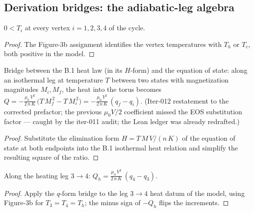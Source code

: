 \subsection*{Derivation bridges: the adiabatic-leg algebra}

\begin{lemma}
\label{lem:IPhO2026Problems_problem_IPhO_2026_3_C_2:vertex_T_pos}
$0 < T_i$ at every vertex $i = 1, 2, 3, 4$ of the cycle.
\end{lemma}
\begin{proof}
The Figure-3b assignment identifies the vertex temperatures with
$T_h$ or $T_c$, both positive in the model.
\end{proof}

\begin{lemma}
\label{lem:IPhO2026Problems_problem_IPhO_2026_3_C_2:heat_isothermal_via_q}
Bridge between the B.1 heat law (in its $H$-form) and the equation of
state: along an isothermal leg at temperature $T$ between two states
with magnetization magnitudes $M_i, M_f$, the heat into the torus
becomes
$Q = -\frac{\mu_0\,V^2}{2\,n\,K}\,\bigl(T\,M_f^{\,2} - T\,M_i^{\,2}\bigr)
 = -\frac{\mu_0\,V^2}{2\,n\,K}\,(q_f - q_i)$.
(Iter-012 restatement to the corrected prefactor; the previous
$\mu_0 V/2$ coefficient missed the EOS substitution factor --- caught
by the iter-011 audit; the Lean ledger was already redrafted.)
\end{lemma}
\begin{proof}
Substitute the elimination form $H = T\,M\,V/(n\,K)$ of the equation
of state at both endpoints into the B.1 isothermal heat relation and
simplify the resulting square of the ratio.
\end{proof}

\begin{lemma}
\label{lem:IPhO2026Problems_problem_IPhO_2026_3_C_2:Qh_eq}
Along the heating leg $3 \to 4$:
$Q_h = \frac{\mu_0\,V^2}{2\,n\,K}\,(q_4 - q_3)$.
\end{lemma}
\begin{proof}
Apply the $q$-form bridge to the leg $3 \to 4$ heat datum of the
model, using Figure-3b for $T_3 = T_4 = T_h$; the minus sign of
$-Q_h$ flips the increments.
\end{proof}

